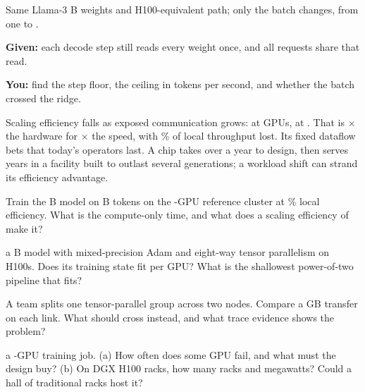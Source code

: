 \documentclass{studysheet}
\begin{document}
\begin{leftcol}
\vspace{12pt}
\begin{practicebox}
Same Llama-3 B weights and H100-equivalent path; only the batch changes, from one to .\par\vspace{4pt}
\textbf{Given:} each decode step still reads every weight once, and all  requests share that read.\par
\textbf{You:} find the step floor, the ceiling in tokens per second, and whether the batch crossed the ridge.
\end{practicebox}
\end{leftcol}%
\begin{rightcol}
%
  {Scaling efficiency falls as exposed communication grows:  at  GPUs,  at
   . That is $\times$ the hardware for $\times$ the speed, with \% of local
   throughput lost.}{}
%
  {Its fixed dataflow bets that today's operators last. A chip takes over a year to design, then serves years
   in a facility built to outlast several generations; a workload shift can strand its efficiency advantage.}{}

\vspace{2pt}
\begin{qs}
\item Train the B model on B tokens on the -GPU reference cluster at
  \% local efficiency. What is the compute-only time, and what does a scaling efficiency of  make it?
\item \assumed{} a B model with mixed-precision Adam and eight-way tensor parallelism on
  H100s. Does its training state fit per GPU? What is the shallowest power-of-two pipeline that fits?
\item A team splits one tensor-parallel group across two nodes. Compare a  GB transfer on
  each link. What should cross instead, and what trace evidence shows the problem?
\item \assumed{} a -GPU training job. (a) How often does some GPU fail, and what must the
  design buy? (b) On DGX H100 racks, how many racks and megawatts? Could a hall of traditional racks host it?
\end{qs}
\end{rightcol}
\end{document}

